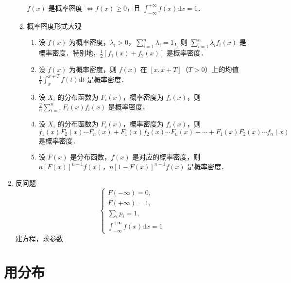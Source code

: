 \begin{enumerate}
\begin{enumerate}
                        $f(x)$ 是概率密度 $\Leftrightarrow f(x) \geqslant 0$，且 $\int_{-\infty}^{+\infty} f(x) \mathrm{d}x = 1$．
                  \item 概率密度形式大观
                        \begin{enumerate}
                              \item 设 $f(x)$ 为概率密度，$\lambda_i > 0$，$\sum_{i=1}^{n} \lambda_i = 1$，则 $\sum_{i=1}^{n} \lambda_i f_i(x)$ 是概率密度．特别地，$\frac{1}{2}[f_1(x) + f_2(x)]$ 是概率密度．
                              \item 设 $f(x)$ 为概率密度，则 $f(x)$ 在 $[x, x+T]$（$T > 0$）上的均值 $\frac{1}{T} \int_{x}^{x+T} f(t) \mathrm{d}t$ 是概率密度．
                              \item 设 $X_i$ 的分布函数为 $F_i(x)$，概率密度为 $f_i(x)$，则 $\frac{2}{n}\sum_{i=1}^{n}F_i(x)f_i(x)$ 是概率密度．
                              \item 设 $X_i$ 的分布函数为 $F_i(x)$，概率密度为 $f_i(x)$，则 $f_1(x)F_2(x)\cdots F_n(x) + F_1(x)f_2(x)\cdots F_n(x) + \cdots + F_1(x)F_2(x)\cdots f_n(x)$ 是概率密度．
                              \item 设 $F(x)$ 是分布函数，$f(x)$ 是对应的概率密度，则 $n[F(x)]^{n-1}f(x)$，$n[1-F(x)]^{n-1}f(x)$ 是概率密度．
                        \end{enumerate}
            \end{enumerate}
      \item 反问题
            $$\begin{cases}F(-\infty)=0,\\F(+\infty)=1,\\\sum_{i}p_{i}=1,\\\int_{-\infty}^{+\infty}f(x)\mathrm{d}x=1 \end{cases}$$
            建方程，求参数
\end{enumerate}
\section{用分布}
\DOne


